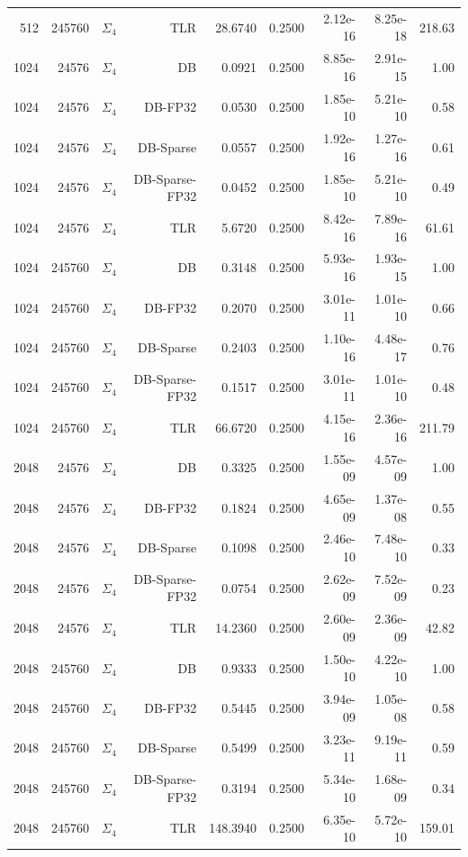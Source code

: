\begin{tabular}{|r|r|r|r|r|r|r|r|r|}
  512 & 245760 & $\Sigma_4$ & TLR & 28.6740 & 0.2500 & 2.12e-16 & 8.25e-18 & 218.63 \\
  1024 & 24576 & $\Sigma_4$ & DB & 0.0921 & 0.2500 & 8.85e-16 & 2.91e-15 & 1.00 \\
  1024 & 24576 & $\Sigma_4$ & DB-FP32 & 0.0530 & 0.2500 & 1.85e-10 & 5.21e-10 & 0.58 \\
  1024 & 24576 & $\Sigma_4$ & DB-Sparse & 0.0557 & 0.2500 & 1.92e-16 & 1.27e-16 & 0.61 \\
  1024 & 24576 & $\Sigma_4$ & DB-Sparse-FP32 & 0.0452 & 0.2500 & 1.85e-10 & 5.21e-10 & 0.49 \\
  1024 & 24576 & $\Sigma_4$ & TLR & 5.6720 & 0.2500 & 8.42e-16 & 7.89e-16 & 61.61 \\
  1024 & 245760 & $\Sigma_4$ & DB & 0.3148 & 0.2500 & 5.93e-16 & 1.93e-15 & 1.00 \\
  1024 & 245760 & $\Sigma_4$ & DB-FP32 & 0.2070 & 0.2500 & 3.01e-11 & 1.01e-10 & 0.66 \\
  1024 & 245760 & $\Sigma_4$ & DB-Sparse & 0.2403 & 0.2500 & 1.10e-16 & 4.48e-17 & 0.76 \\
  1024 & 245760 & $\Sigma_4$ & DB-Sparse-FP32 & 0.1517 & 0.2500 & 3.01e-11 & 1.01e-10 & 0.48 \\
  1024 & 245760 & $\Sigma_4$ & TLR & 66.6720 & 0.2500 & 4.15e-16 & 2.36e-16 & 211.79 \\
  2048 & 24576 & $\Sigma_4$ & DB & 0.3325 & 0.2500 & 1.55e-09 & 4.57e-09 & 1.00 \\
  2048 & 24576 & $\Sigma_4$ & DB-FP32 & 0.1824 & 0.2500 & 4.65e-09 & 1.37e-08 & 0.55 \\
  2048 & 24576 & $\Sigma_4$ & DB-Sparse & 0.1098 & 0.2500 & 2.46e-10 & 7.48e-10 & 0.33 \\
  2048 & 24576 & $\Sigma_4$ & DB-Sparse-FP32 & 0.0754 & 0.2500 & 2.62e-09 & 7.52e-09 & 0.23 \\
  2048 & 24576 & $\Sigma_4$ & TLR & 14.2360 & 0.2500 & 2.60e-09 & 2.36e-09 & 42.82 \\
  2048 & 245760 & $\Sigma_4$ & DB & 0.9333 & 0.2500 & 1.50e-10 & 4.22e-10 & 1.00 \\
  2048 & 245760 & $\Sigma_4$ & DB-FP32 & 0.5445 & 0.2500 & 3.94e-09 & 1.05e-08 & 0.58 \\
  2048 & 245760 & $\Sigma_4$ & DB-Sparse & 0.5499 & 0.2500 & 3.23e-11 & 9.19e-11 & 0.59 \\
  2048 & 245760 & $\Sigma_4$ & DB-Sparse-FP32 & 0.3194 & 0.2500 & 5.34e-10 & 1.68e-09 & 0.34 \\
  2048 & 245760 & $\Sigma_4$ & TLR & 148.3940 & 0.2500 & 6.35e-10 & 5.72e-10 & 159.01 \\

\end{tabular}
